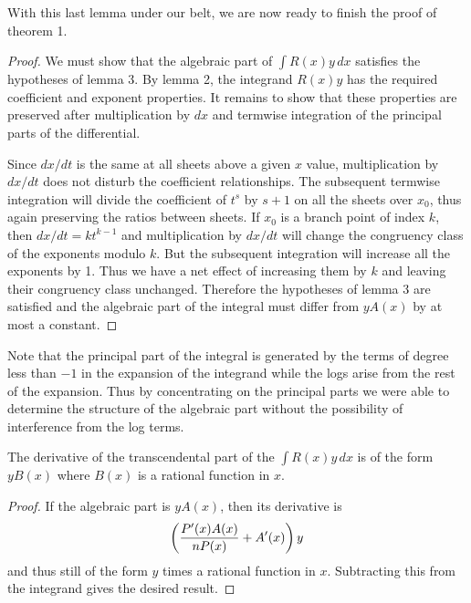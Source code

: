 With this last lemma under our belt, we are now ready to finish
the proof of theorem 1.

\begin{proof}
We must show that the algebraic part of $\int R(x)y\,dx$ satisfies the
hypotheses of lemma 3.  By lemma 2, the integrand $R(x)y$ has the
required coefficient and exponent properties.  It remains to show that
these properties are preserved after multiplication by $dx$ and
termwise integration of the principal parts of the differential.

Since $dx/dt$ is the same at all sheets above a given $x$ value, 
multiplication by $dx/dt$ does not disturb the coefficient relationships.
The subsequent termwise integration will divide the coefficient
of $t^s$ by $s+1$ on all the sheets over $x_0$, thus again preserving
the ratios between sheets.  If $x_0$ is a branch point of index $k$,
then $dx/dt = kt^{k-1}$ and multiplication by $dx/dt$ will change
the congruency class of the exponents modulo $k$.  But the subsequent
integration will increase all the exponents by 1. Thus we have a net
effect of increasing them by $k$ and leaving their congruency class
unchanged.  Therefore the hypotheses of lemma 3 are satisfied
and the algebraic part of the integral must differ from $yA(x)$ by
at most a constant.
\end{proof}

Note that the principal
part of the integral is generated by the terms of degree less than $-1$ in
the expansion of the integrand while the logs arise from the rest of the
expansion.  Thus by concentrating on the principal parts we were
able to determine the structure of the algebraic part without
the possibility of interference from the log terms.


\begin{corollary}
The derivative of the transcendental part of the $\int R(x)y\,dx$ is
of the form $y B(x)$ where $B(x)$ is a rational function in $x$.
\end{corollary}

\begin{proof}
If the algebraic part is $y A(x)$, then its derivative is
\[
\left({P'(x)A(x) \over nP(x)} + A'(x)\right)y
\]
and thus still of the form $y$ times a rational function in $x$.
Subtracting this from the integrand gives the desired result.
\end{proof}


